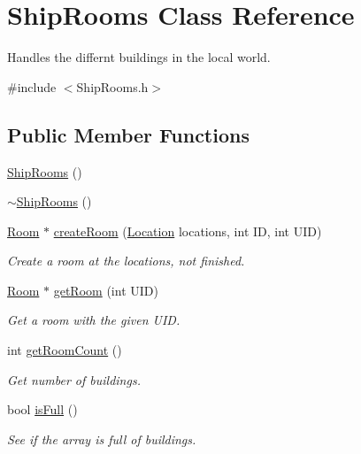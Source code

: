 \hypertarget{classShipRooms}{\section{Ship\-Rooms Class Reference}
\label{classShipRooms}
}


Handles the differnt buildings in the local world.  




{\ttfamily \#include $<$Ship\-Rooms.\-h$>$}

\subsection*{Public Member Functions}
\begin{DoxyCompactItemize}
\item 
\hyperlink{classShipRooms_ae299a6bbd005215c8658477a7b597145}{Ship\-Rooms} ()
\item 
\hyperlink{classShipRooms_a91ffe6717a8fe8111221214b60a2a58e}{$\sim$\-Ship\-Rooms} ()
\item 
\hyperlink{classRoom}{Room} $\ast$ \hyperlink{classShipRooms_ac12f32192d9d412ed326ece60b9d4546}{create\-Room} (\hyperlink{structLocation}{Location} locations, int I\-D, int U\-I\-D)
\begin{DoxyCompactList}\small\item\em Create a room at the locations, not finished. \end{DoxyCompactList}\item 
\hyperlink{classRoom}{Room} $\ast$ \hyperlink{classShipRooms_a8b495f2e403bbcf1662a8cf0b7ee0ca8}{get\-Room} (int U\-I\-D)
\begin{DoxyCompactList}\small\item\em Get a room with the given U\-I\-D. \end{DoxyCompactList}\item 
int \hyperlink{classShipRooms_a75d0e81e4a6c2377bcfb76a015b1585e}{get\-Room\-Count} ()
\begin{DoxyCompactList}\small\item\em Get number of buildings. \end{DoxyCompactList}\item 
bool \hyperlink{classShipRooms_a7ef60080c85ae4495e9ff4dc7fd74818}{is\-Full} ()
\begin{DoxyCompactList}\small\item\em See if the array is full of buildings. \end{DoxyCompactList}\end{DoxyCompactItemize}
